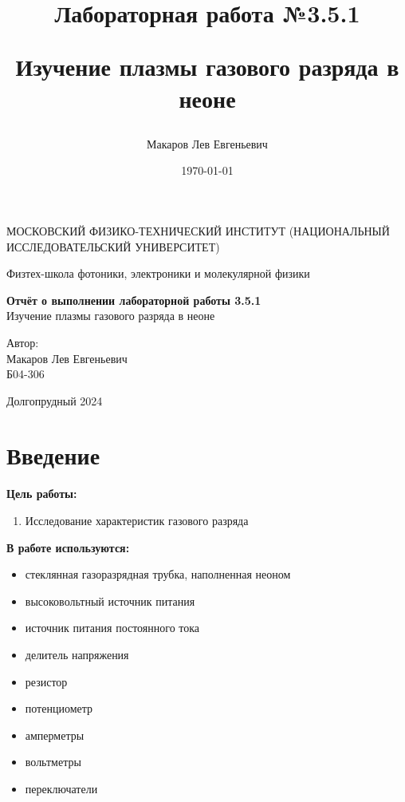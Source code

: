 \documentclass[a4paper,12pt]{article}
\author{Макаров Лев Евгеньевич}
\title{Лабораторная работа №3.5.1

Изучение плазмы газового разряда в неоне
}
\date{\today}
\begin{document}
\begin{titlepage}
	\begin{center}
		{\large МОСКОВСКИЙ ФИЗИКО-ТЕХНИЧЕСКИЙ ИНСТИТУТ (НАЦИОНАЛЬНЫЙ ИССЛЕДОВАТЕЛЬСКИЙ УНИВЕРСИТЕТ)}
	\end{center}
	\begin{center}
		{\large Физтех-школа фотоники, электроники и молекулярной физики}
	\end{center}
	
	
	\vspace{4.5cm}
	{\huge
		\begin{center}
			{\bf Отчёт о выполнении лабораторной работы 3.5.1}\\
			Изучение плазмы газового разряда в неоне
		\end{center}
	}
	\vspace{2cm}
	\begin{flushright}
		{\LARGE Автор:\\ Макаров Лев Евгеньевич \\
			\vspace{0.2cm}
			Б04-306}
	\end{flushright}
	\vspace{8cm}
	\begin{center}
		Долгопрудный 2024
	\end{center}
\end{titlepage}

\section{Введение}

\textbf{Цель работы:} 
\begin{enumerate}
	\item Исследование характеристик газового разряда
\end{enumerate}

\textbf{В работе используются:} 
\begin{itemize}
    \item стеклянная газоразрядная трубка, наполненная неоном
    \item высоковольтный источник питания
    \item источник питания постоянного тока
    \item делитель напряжения
    \item резистор
    \item потенциометр
    \item амперметры
    \item вольтметры
    \item переключатели
\end{itemize}
\medskip
\end{document}
